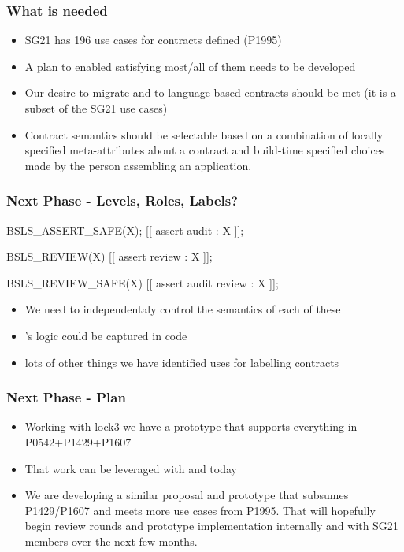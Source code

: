 \begin{frame}
  \frametitle{What is needed}

  \begin{itemize}
  \item SG21 has 196 use cases for contracts defined (P1995)
  \item A plan to enabled satisfying most/all of them needs to be developed
  \item Our desire to migrate  and  to language-based contracts
    should be met (it is a subset of the SG21 use cases)
  \item Contract semantics should be selectable based on a combination of locally specified
    meta-attributes about a contract and build-time specified choices made by the person assembling
    an application.
  \end{itemize}
\end{frame}

\begin{frame}[fragile]
  \frametitle{Next Phase - Levels, Roles, Labels?}

  \begin{cppcodebox}
    BSLS_ASSERT_SAFE(X);
    [[ assert audit : X ]];

    BSLS_REVIEW(X)
    [[ assert review : X ]];

    BSLS_REVIEW_SAFE(X)
    [[ assert audit review : X ]];
  \end{cppcodebox}

  \begin{itemize}
  \item We need to independentaly control the semantics of each of these
  \item {}'s logic could be captured in code
  \item lots of other things we have identified uses for labelling contracts
  \end{itemize}
\end{frame}

\begin{frame}
  \frametitle{Next Phase - Plan }

  \begin{itemize}
  \item Working with lock3 we have a prototype that supports everything in P0542+P1429+P1607
  \item That work can be leveraged with  and  today
  \item We are developing a similar proposal and prototype that subsumes P1429/P1607 and
    meets more use cases from P1995.  That will hopefully begin review rounds and prototype implementation
    internally and with SG21 members over the next few months.    
  \end{itemize}

\end{frame}


